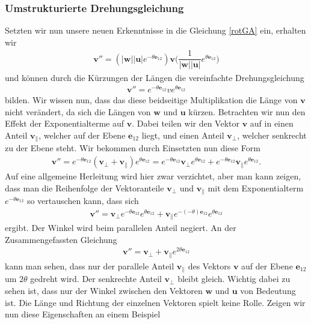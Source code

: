 \subsubsection{Umstrukturierte Drehungsgleichung}
Setzten wir nun unsere neuen Erkenntnisse in die Gleichung \eqref{rotGA} ein, erhalten wir
\begin{align}
\mathbf{v''} = (|\mathbf{w}||\mathbf{u}|e^{-\theta \mathbf{e}_{12}})\mathbf{v}\biggl(\dfrac{1}{|\mathbf{w}||\mathbf{u}|}e^{\theta \mathbf{e}_{12}}\biggr)
\end{align}
und können durch die Kürzungen der Längen die vereinfachte Drehungsgleichung
\begin{align} \label{GAvereinfRot}
\mathbf{v''} = e^{-\theta \mathbf{e}_{12}} v e^{\theta \mathbf{e}_{12}}
\end{align}
bilden. Wir wissen nun, dass das diese beidseitige Multiplikation die Länge von $\mathbf{v}$ nicht verändert, da sich die Längen von $\mathbf{w}$ und $\mathbf{u}$ kürzen. Betrachten wir nun den Effekt der Exponentialterme auf $\mathbf{v}$. Dabei teilen wir den Vektor $\mathbf{v}$ auf in einen Anteil $\mathbf{v_\parallel}$, welcher auf der Ebene $\mathbf{e}_{12}$ liegt, und einen Anteil $\mathbf{v_\perp}$, welcher senkrecht zu der Ebene steht. Wir bekommen durch Einsetzten nun diese Form
\begin{align} \label{RotAufPerpPar}
\mathbf{v}'' = e^{-\theta \mathbf{e}_{12}} (\mathbf{v_\perp + v_\parallel}) e^{\theta \mathbf{e}_{12}} = e^{-\theta \mathbf{e}_{12}} \mathbf{v_\perp} e^{\theta \mathbf{e}_{12}} + e^{-\theta \mathbf{e}_{12}} \mathbf{v_\parallel} e^{\theta \mathbf{e}_{12}}.
\end{align}
Auf eine allgemeine Herleitung wird hier zwar verzichtet, aber man kann zeigen, dass man die Reihenfolge der Vektoranteile $\mathbf{v_\perp}$ und $\mathbf{v_\parallel}$ mit dem Exponentialterm $e^{-\theta \mathbf{e}_{12}}$ so vertauschen kann, dass sich 
\begin{align}
\mathbf{v}'' = \mathbf{v_\perp} e^{-\theta \mathbf{e}_{12}}  e^{\theta \mathbf{e}_{12}} +  \mathbf{v_\parallel} e^{-(-\theta) \mathbf{e}_{12}} e^{\theta \mathbf{e}_{12}}
\end{align}
ergibt. Der Winkel wird beim parallelen Anteil negiert. An der Zusammengefassten Gleichung
\begin{align}\label{RotParPerp}
\mathbf{v}'' = \mathbf{v_\perp} +  \mathbf{v_\parallel} e^{2\theta \mathbf{e}_{12}}
\end{align}
kann man sehen, dass nur der parallele Anteil $\mathbf{v_\parallel}$ des Vektors $\mathbf{v}$ auf der Ebene $\mathbf{e}_{12}$ um $2\theta$ gedreht wird. Der senkrechte Anteil $\mathbf{v_\perp}$ bleibt gleich. Wichtig dabei zu sehen ist, dass nur der Winkel zwischen den Vektoren $\mathbf{w}$ und $\mathbf{u}$ von Bedeutung ist. Die Länge und Richtung der einzelnen Vektoren spielt keine Rolle. Zeigen wir nun diese Eigenschaften an einem Beispiel
